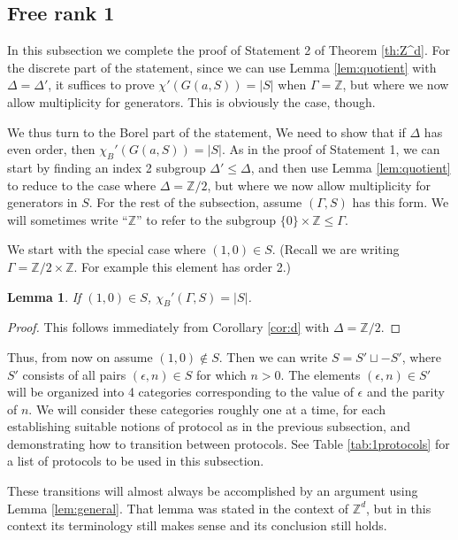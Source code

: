 \documentclass[12pt]{article}
\newcommand{\0}{\varnothing}
\newcommand{\Z}{\mathbb{Z}}
\newtheorem{lemma}{Lemma}
\begin{document}
\subsection{Free rank 1}\label{subsec:1}

In this subsection we complete the proof of Statement 2 of Theorem \ref{th:Z^d}. For the discrete part of the statement, since we can use Lemma \ref{lem:quotient} with $\Delta = \Delta'$, it suffices to prove $\chi'(G(a,S)) = |S|$ when $\Gamma = \Z$, but where we now allow multiplicity for generators. This is obviously the case, though.

We thus turn to the Borel part of the statement, We need to show that if $\Delta$ has even order, then $\chi_B'(G(a,S)) = |S|$. As in the proof of Statement 1, we can start by finding an index 2 subgroup $\Delta' \leq \Delta$, and then use Lemma \ref{lem:quotient} to reduce to the case where $\Delta = \Z/2$, but where we now allow multiplicity for generators in $S$. For the rest of the subsection, assume $(\Gamma,S)$ has this form. We will sometimes write ``$\Z$'' to refer to the subgroup $\{0\} \times \Z \leq \Gamma$.

We start with the special case where $(1,0) \in S$. (Recall we are writing $\Gamma = \Z/2 \times \Z$. For example this element has order 2.)

\begin{lemma}\label{lem:(1,0)}
If $(1,0) \in S$, $\chi_B'(\Gamma,S) = |S|$.
\end{lemma}

\begin{proof}
This follows immediately from Corollary \ref{cor:d} with $\Delta = \Z/2$.
\end{proof}

Thus, from now on assume $(1,0) \not\in S$. Then we can write $S = S' \sqcup -S'$, where $S'$ consists of all pairs $(\epsilon,n) \in S$ for which $n > 0$. The elements $(\epsilon,n) \in S'$ will be organized into 4 categories corresponding to the value of $\epsilon$ and the parity of $n$. We will consider these categories roughly one at a time, for each establishing suitable notions of protocol as in the previous subsection, and demonstrating how to transition between protocols. See Table \ref{tab:1protocols} for a list of protocols to be used in this subsection.

These transitions will almost always be accomplished by an argument using Lemma \ref{lem:general}. That lemma was stated in the context of $\Z^d$, but in this context its terminology still makes sense and its conclusion still holds.
\end{document}
